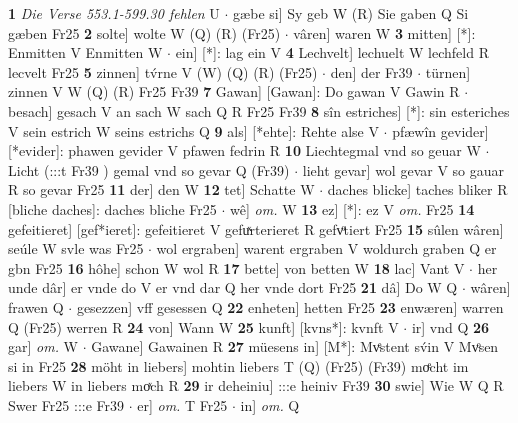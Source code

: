 \documentclass[8pt,a4paper,notitlepage]{article}
\begin{document}
\begin{table}[ht]
\begin{minipage}[t]{0.5\linewidth}
\textbf{1} \textit{Die Verse 553.1-599.30 fehlen} U   $\cdot$ gæbe si] Sy geb W (R) Sie gaben Q Si gæben Fr25 \textbf{2} solte] wolte W (Q) (R) (Fr25)  $\cdot$ vâren] waren W \textbf{3} mitten] [*]: Enmitten V Enmitten W  $\cdot$ ein] [*]: lag ein V \textbf{4} Lechvelt] lechuelt W lechfeld R lecvelt Fr25 \textbf{5} zinnen] tv́rne V (W) (Q) (R) (Fr25)  $\cdot$ den] der Fr39  $\cdot$ türnen] zinnen V W (Q) (R) Fr25 Fr39 \textbf{7} Gawan] [Gawan]: Do gawan V Gawin R  $\cdot$ besach] gesach V an sach W sach Q R Fr25 Fr39 \textbf{8} sîn estriches] [*]: sin esteriches V sein estrich W seins estrichs Q \textbf{9} als] [*ehte]: Rehte alse V  $\cdot$ pfæwîn gevider] [*evider]: phawen gevider V pfawen fedrin R \textbf{10} Liechtegmal vnd so geuar W  $\cdot$ Licht (:::t Fr39 ) gemal vnd so gevar Q (Fr39)  $\cdot$ lieht gevar] wol gevar V so gauar R so gevar Fr25 \textbf{11} der] den W \textbf{12} tet] Schatte W  $\cdot$ daches blicke] taches bliker R [bliche daches]: daches bliche Fr25  $\cdot$ wê] \textit{om.} W \textbf{13} ez] [*]: ez V \textit{om.} Fr25 \textbf{14} gefeitieret] [gef*ieret]: gefeitieret V gefuͯrterieret R gefvͦtiert Fr25 \textbf{15} sûlen wâren] seúle W svle was Fr25  $\cdot$ wol ergraben] warent ergraben V woldurch graben Q er gbn Fr25 \textbf{16} hôhe] schon W wol R \textbf{17} bette] von betten W \textbf{18} lac] Vant V  $\cdot$ her unde dâr] er vnde do V er vnd dar Q her vnde dort Fr25 \textbf{21} dâ] Do W Q  $\cdot$ wâren] frawen Q  $\cdot$ gesezzen] vff gesessen Q \textbf{22} enheten] hetten Fr25 \textbf{23} enwæren] warren Q (Fr25) werren R \textbf{24} von] Wann W \textbf{25} kunft] [kvns*]: kvnft V  $\cdot$ ir] vnd Q \textbf{26} gar] \textit{om.} W  $\cdot$ Gawane] Gawainen R \textbf{27} müesens in] [M*]: Mvͤstent sv́in V Mvͦsen si in Fr25 \textbf{28} möht in liebers] mohtin liebers T (Q) (Fr25) (Fr39) moͤcht im liebers W in liebers moͯch R \textbf{29} ir deheiniu] :::e heiniv Fr39 \textbf{30} swie] Wie W Q R Swer Fr25 :::e Fr39  $\cdot$ er] \textit{om.} T Fr25  $\cdot$ in] \textit{om.} Q \newline
\end{minipage}
\end{table}
\end{document}
